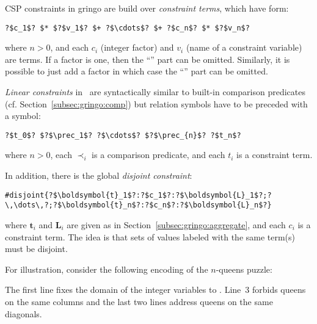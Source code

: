 CSP constraints in gringo are build over \emph{constraint terms}, which have form:
\begin{lstlisting}[numbers=none,escapechar=?]
?$c_1$? $* $?$v_1$? $+ ?$\cdots$? $+ ?$c_n$? $* $?$v_n$?
\end{lstlisting}
where $n>0$, and each $c_i$ (integer factor) and $v_i$ (name of a constraint variable) are terms.
If a factor is one, then the ``'' part can be omitted.
Similarly, it is possible to just add a factor in which case the ``'' part can be omitted.

\emph{Linear constraints} in \gringo\ are syntactically similar to built-in comparison predicates (cf. Section~\ref{subsec:gringo:comp})
but relation symbols have to be preceded with a \code{\$} symbol:
\begin{lstlisting}[numbers=none,escapechar=?]
?$t_0$? $?$\prec_1$? ?$\cdots$? $?$\prec_{n}$? ?$t_n$?
\end{lstlisting}
where $n>0$, each $\prec_i$ is a comparison predicate, and each $t_i$ is a constraint term.

In addition, there is the global \emph{disjoint constraint}:
\begin{lstlisting}[numbers=none,escapechar=?]
#disjoint{?$\boldsymbol{t}_1$?:?$c_1$?:?$\boldsymbol{L}_1$?;?\,\dots\,?;?$\boldsymbol{t}_n$?:?$c_n$?:?$\boldsymbol{L}_n$?}
\end{lstlisting}
where $\boldsymbol{t}_i$ and $\boldsymbol{L}_i$ are given as in Section~\ref{subsec:gringo:aggregate},
and each $c_i$ is a constraint term.
%
The idea is that sets of values labeled with the same term(s) must be disjoint.

\begin{example}\label{ex:csp:queens1}
For illustration,
consider the following encoding of the $n$-queens puzzle:


The first line fixes the domain of the integer variables
 to .
Line~3 forbids queens on the same columns and the last two lines address queens on the same diagonals.
\end{example}

